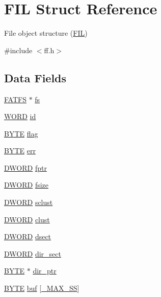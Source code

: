 \hypertarget{structFIL}{\section{F\-I\-L Struct Reference}
\label{structFIL}
}


File object structure (\hyperlink{structFIL}{F\-I\-L})  




{\ttfamily \#include $<$ff.\-h$>$}

\subsection*{Data Fields}
\begin{DoxyCompactItemize}
\item 
\hyperlink{structFATFS}{F\-A\-T\-F\-S} $\ast$ \hyperlink{structFIL_a42376a6797a06228911c8b836c1e9030}{fs}
\item 
\hyperlink{integer_8h_a197942eefa7db30960ae396d68339b97}{W\-O\-R\-D} \hyperlink{structFIL_af7cae0063b0045fb7078b560101ba8f2}{id}
\item 
\hyperlink{integer_8h_a4ae1dab0fb4b072a66584546209e7d58}{B\-Y\-T\-E} \hyperlink{structFIL_ac409508881f5a16f2998ae675072b376}{flag}
\item 
\hyperlink{integer_8h_a4ae1dab0fb4b072a66584546209e7d58}{B\-Y\-T\-E} \hyperlink{structFIL_aea440945db26de9c4a88065c0c887fda}{err}
\item 
\hyperlink{integer_8h_ad342ac907eb044443153a22f964bf0af}{D\-W\-O\-R\-D} \hyperlink{structFIL_a75d29cf9257c827d117887b9f924c4a9}{fptr}
\item 
\hyperlink{integer_8h_ad342ac907eb044443153a22f964bf0af}{D\-W\-O\-R\-D} \hyperlink{structFIL_aa00790d40d7b0081c345fd4f76e22b70}{fsize}
\item 
\hyperlink{integer_8h_ad342ac907eb044443153a22f964bf0af}{D\-W\-O\-R\-D} \hyperlink{structFIL_ad308b74c8d6975c6a9c30d90b4124c40}{sclust}
\item 
\hyperlink{integer_8h_ad342ac907eb044443153a22f964bf0af}{D\-W\-O\-R\-D} \hyperlink{structFIL_aa41312aba551b9a6d1c9d3c8c7d2734b}{clust}
\item 
\hyperlink{integer_8h_ad342ac907eb044443153a22f964bf0af}{D\-W\-O\-R\-D} \hyperlink{structFIL_ab3d4165d6fd32ac71a130d835fbf0b4d}{dsect}
\item 
\hyperlink{integer_8h_ad342ac907eb044443153a22f964bf0af}{D\-W\-O\-R\-D} \hyperlink{structFIL_ab203794f939ad4480e81dfa488770783}{dir\-\_\-sect}
\item 
\hyperlink{integer_8h_a4ae1dab0fb4b072a66584546209e7d58}{B\-Y\-T\-E} $\ast$ \hyperlink{structFIL_a5af9e9fb312b629220eaf684dd28c4a9}{dir\-\_\-ptr}
\item 
\hyperlink{integer_8h_a4ae1dab0fb4b072a66584546209e7d58}{B\-Y\-T\-E} \hyperlink{structFIL_a7a95fb86588663e48309b5cded7e207b}{buf} \mbox{[}\hyperlink{ffconf_8h_ac271b697378912f17132cb9c7d0de024}{\-\_\-\-M\-A\-X\-\_\-\-S\-S}\mbox{]}
\end{DoxyCompactItemize}


